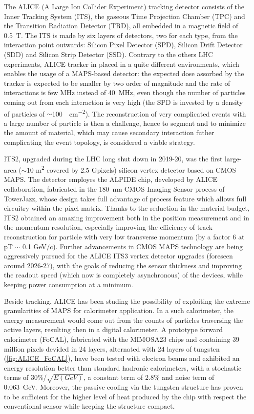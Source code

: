         The ALICE (A Large Ion Collider Experiment) tracking detector consists of the Inner Tracking System (ITS), the gaseous Time Projection Chamber (TPC) and the Transition Radiation Detector (TRD), all embedded in a magnetic field of \SI{0.5}{T}. The ITS is made by six layers of detectors, two for each type, from the interaction point outwards: Silicon Pixel Detector (SPD), Silicon Drift Detector (SDD) and Silicon Strip Detector (SSD).         
        Contrary to the others LHC experiments, ALICE tracker in placed in a quite different environments, which enables the usage of a MAPS-based detector: the expected dose assorbed by the tracker is expected to be smaller by two order of magnitude and the rate of interactions is few \si{MHz} instead of \SI{40}{MHz}, even though the number of particles coming out from each interaction is very high (the SPD is invested by a density of particles of $\sim$\SI{100}{\per cm\tothe{-2}}).  
        The reconstruction of very complicated events with a large number of particle is then a challenge, hence to segment and to minimize the amount of material, which may cause secondary interaction futher complicating the event topology, is considered a viable strategy. 
        
        ITS2, upgraded during the LHC long shut down in 2019-20, was the first large-area ($\sim$10 \si{m\squared} covered by 2.5 Gpixels) silicon vertex detector based on CMOS MAPS.
        The detector employes the ALPIDE chip, developed by ALICE collaboration, fabricated in the \SI{180}{nm} CMOS Imaging Sensor process of TowerJazz, whose design takes full advantage of process feature which allows full circuitry within the pixel matrix.
        Thanks to the reduction in the material budget, ITS2 obtained an amazing improvement both in the position measurement and in the momentum resolution, especially improving the efficiency of track reconstruction for particle with very low transverse momentum (by a factor 6 at pT $\sim$ 0.1 GeV/c). Further advancements in CMOS MAPS technology are being aggressively pursued for the ALICE ITS3 vertex detector upgrades (foreseen around 2026-27), with the goals of reducing the sensor thickness and improving the readout speed (which now is completely asynchronous) of the devices, while keeping power consumption at a minimum.

        Beside tracking, ALICE has been studing the possibility of exploiting the extreme granularities of MAPS for calorimeter application. In a such calorimeter, the energy measurement would come out from the counts of particles traversing the active layers, resulting then in a digital calorimeter. A prototype forward calorimeter (FoCAL), fabricated with the MIMOSA23 chips and containing 39 million pixels devided in 24 layers, alternated with 24 layers of tungsten (\ref{fig:ALICE_FoCAL}), have been tested with electron beams and exhibited an energy resolution better than standard hadronic calorimeters, with a stochastic terms of 30\%/$\sqrt{E(GeV)}$, a constant term of 2.8\% and noise term of \SI{0.063}{GeV}.
        Moreover, the passive cooling via the tungsten structure has proven to be sufficient for the higher level of heat produced by the chip with respect the conventional sensor while keeping the structure compact. 

